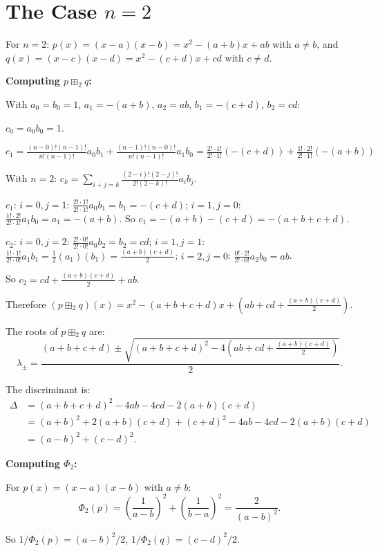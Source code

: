 \documentclass[12pt]{article}
\begin{document}
\section{The Case $n = 2$}

For $n = 2$: $p(x) = (x-a)(x-b) = x^2 - (a+b)x + ab$ with $a \neq b$, and $q(x) = (x-c)(x-d) = x^2 - (c+d)x + cd$ with $c \neq d$.

\textbf{Computing $p \boxplus_2 q$:}

With $a_0 = b_0 = 1$, $a_1 = -(a+b)$, $a_2 = ab$, $b_1 = -(c+d)$, $b_2 = cd$:

$c_0 = a_0 b_0 = 1$.

$c_1 = \frac{(n-0)!(n-1)!}{n!(n-1)!} a_0 b_1 + \frac{(n-1)!(n-0)!}{n!(n-1)!} a_1 b_0 = \frac{2! \cdot 1!}{2! \cdot 1!}(-(c+d)) + \frac{1! \cdot 2!}{2! \cdot 1!}(-(a+b))$

With $n=2$: $c_k = \sum_{i+j=k} \frac{(2-i)!(2-j)!}{2!(2-k)!} a_i b_j$.

$c_1$: $i=0, j=1$: $\frac{2! \cdot 1!}{2! \cdot 1!} a_0 b_1 = b_1 = -(c+d)$; $i=1, j=0$: $\frac{1! \cdot 2!}{2! \cdot 1!} a_1 b_0 = a_1 = -(a+b)$. So $c_1 = -(a+b) - (c+d) = -(a+b+c+d)$.

$c_2$: $i=0, j=2$: $\frac{2! \cdot 0!}{2! \cdot 0!} a_0 b_2 = b_2 = cd$; $i=1,j=1$: $\frac{1!\cdot1!}{2!\cdot0!} a_1 b_1 = \frac{1}{2}(a_1)(b_1) = \frac{(a+b)(c+d)}{2}$; $i=2,j=0$: $\frac{0!\cdot2!}{2!\cdot0!}a_2 b_0 = ab$.

So $c_2 = cd + \frac{(a+b)(c+d)}{2} + ab$.

Therefore $(p \boxplus_2 q)(x) = x^2 - (a+b+c+d)x + \left(ab + cd + \frac{(a+b)(c+d)}{2}\right)$.

The roots of $p \boxplus_2 q$ are:
\[
\lambda_\pm = \frac{(a+b+c+d) \pm \sqrt{(a+b+c+d)^2 - 4\left(ab+cd+\frac{(a+b)(c+d)}{2}\right)}}{2}.
\]

The discriminant is:
\begin{align*}
\Delta &= (a+b+c+d)^2 - 4ab - 4cd - 2(a+b)(c+d) \\
&= (a+b)^2 + 2(a+b)(c+d) + (c+d)^2 - 4ab - 4cd - 2(a+b)(c+d) \\
&= (a-b)^2 + (c-d)^2.
\end{align*}

\textbf{Computing $\Phi_2$:}

For $p(x) = (x-a)(x-b)$ with $a \neq b$:
\[
\Phi_2(p) = \left(\frac{1}{a-b}\right)^2 + \left(\frac{1}{b-a}\right)^2 = \frac{2}{(a-b)^2}.
\]

So $1/\Phi_2(p) = (a-b)^2/2$, $1/\Phi_2(q) = (c-d)^2/2$.
\end{document}
